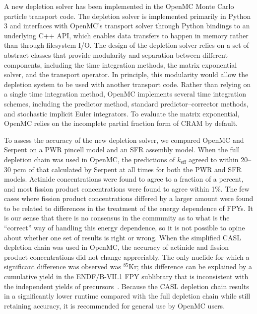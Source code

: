 \documentclass[3p,authoryear]{elsarticle}
\begin{document}
A new depletion solver has been implemented in the OpenMC Monte Carlo particle
transport code. The depletion solver is implemented primarily in Python 3 and
interfaces with OpenMC's transport solver through Python bindings to an
underlying C++ API, which enables data transfers to happen in memory rather than
through filesystem I/O. The design of the depletion solver relies on a set of
abstract classes that provide modularity and separation between different
components, including the time integration methods, the matrix exponential
solver, and the transport operator. In principle, this modularity would allow
the depletion system to be used with another transport code. Rather than relying
on a single time integration method, OpenMC implements several time integration
schemes, including the predictor method, standard predictor--corrector methods,
and stochastic implicit Euler integrators. To evaluate the matrix exponential,
OpenMC relies on the incomplete partial fraction form of CRAM by default.

To assess the accuracy of the new depletion solver, we compared OpenMC and
Serpent on a PWR pincell model and an SFR assembly model. When the full
depletion chain was used in OpenMC, the predictions of $k_\text{eff}$ agreed to
within 20--30 pcm of that calculated by Serpent at all times for both the PWR
and SFR models. Actinide concentrations were found to agree to a fraction of a
percent, and most fission product concentrations were found to agree within 1\%.
The few cases where fission product concentrations differed by a larger amount
were found to be related to differences in the treatment of the energy
dependence of FPYs. It is our sense that there is no consensus in the community
as to what is the ``correct'' way of handling this energy dependence, so it is
not possible to opine about whether one set of results is right or wrong. When
the simplified CASL depletion chain was used in OpenMC, the accuracy of actinide
and fission product concentrations did not change appreciably. The only nuclide
for which a significant difference was observed was $^{85}$Kr; this difference
can be explained by a cumulative yield in the ENDF/B-VII.1 FPY sublibrary that
is inconsistent with the independent yields of precursors~\citep{pigni2015nds}.
Because the CASL depletion chain results in a significantly lower runtime
compared with the full depletion chain while still retaining accuracy, it is
recommended for general use by OpenMC users.
\end{document}
